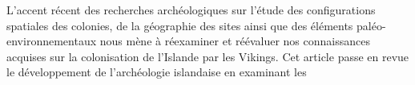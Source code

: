 \begin{shaded}
\hspace*{1em}L’accent récent des\mbox{}\newline 
\hspace*{1em}\hspace*{1em}\hspace*{1em}\hspace*{1em} recherches archéologiques sur l’étude des\mbox{}\newline 
\hspace*{1em}\hspace*{1em}\hspace*{1em}\hspace*{1em} configurations spatiales des colonies, de la\mbox{}\newline 
\hspace*{1em}\hspace*{1em}\hspace*{1em}\hspace*{1em} géographie des sites ainsi que des éléments\mbox{}\newline 
\hspace*{1em}\hspace*{1em}\hspace*{1em}\hspace*{1em} paléo-environnementaux nous mène à réexaminer\mbox{}\newline 
\hspace*{1em}\hspace*{1em}\hspace*{1em}\hspace*{1em} et réévaluer nos connaissances acquises sur\mbox{}\newline 
\hspace*{1em}\hspace*{1em}\hspace*{1em}\hspace*{1em} la colonisation de l’Islande par les Vikings.\mbox{}\newline 
\hspace*{1em}\hspace*{1em}\hspace*{1em}\hspace*{1em} Cet article passe en revue le développement\mbox{}\newline 
\hspace*{1em}\hspace*{1em}\hspace*{1em}\hspace*{1em} de l’archéologie islandaise en examinant les\mbox{}\newline 

\end{shaded}
